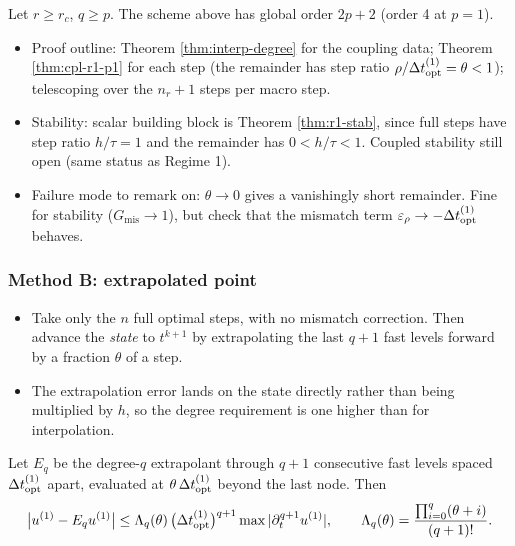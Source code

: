 \begin{theorem}\label{thm:regime2-A}
  Let $r \ge r_c$, $q \ge p$. The scheme above has global order $2p+2$ (order 4 at $p=1$).
\end{theorem}

\begin{itemize}
  \item Proof outline: Theorem \ref{thm:interp-degree} for the coupling data; Theorem \ref{thm:cpl-r1-p1} for each step (the remainder has step ratio $\rho/\Delta t_{\mathrm{opt}}^{(1)} = \theta < 1$); telescoping over the $n_r+1$ steps per macro step.
  \item Stability: scalar building block is Theorem \ref{thm:r1-stab}, since full steps have step ratio $h/\tau = 1$ and the remainder has $0<h/\tau<1$. Coupled stability still open (same status as Regime 1).
  \item Failure mode to remark on: $\theta \to 0$ gives a vanishingly short remainder. Fine for stability ($G_{\mathrm{mis}} \to 1$), but check that the mismatch term $\varepsilon_\rho \to -\Delta t_{\mathrm{opt}}^{(1)}$ behaves.
\end{itemize}

\subsubsection{Method B: extrapolated point}

\begin{itemize}
  \item Take only the $n$ full optimal steps, with no mismatch correction. Then advance the \emph{state} to $t^{k+1}$ by extrapolating the last $q+1$ fast levels forward by a fraction $\theta$ of a step.
  \item The extrapolation error lands on the state directly rather than being multiplied by $h$, so the degree requirement is one higher than for interpolation.
\end{itemize}

\begin{lemma}\label{lem:extrap-err}
  Let $E_q$ be the degree-$q$ extrapolant through $q+1$ consecutive fast levels spaced $\Delta t_{\mathrm{opt}}^{(1)}$ apart, evaluated at $\theta\,\Delta t_{\mathrm{opt}}^{(1)}$ beyond the last node. Then
  \[
    \bigl| u^{(1)} - E_q u^{(1)} \bigr| \le \Lambda_q(\theta)\,\bigl(\Delta t_{\mathrm{opt}}^{(1)}\bigr)^{q+1} \max|\partial_t^{q+1} u^{(1)}|, \qquad \Lambda_q(\theta) = \frac{\prod_{i=0}^{q} (\theta + i)}{(q+1)!} .
  \]
\end{lemma}

